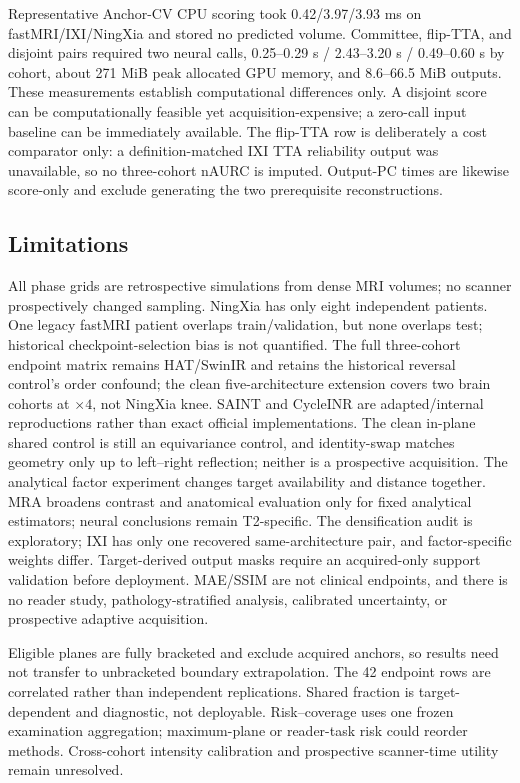 \documentclass[journal,10pt]{IEEEtran}
\begin{document}
Representative Anchor-CV CPU scoring took 0.42/3.97/3.93 ms on fastMRI/IXI/NingXia and stored no predicted volume. Committee, flip-TTA, and disjoint pairs required two neural calls, 0.25--0.29 s / 2.43--3.20 s / 0.49--0.60 s by cohort, about 271 MiB peak allocated GPU memory, and 8.6--66.5 MiB outputs. These measurements establish computational differences only. A disjoint score can be computationally feasible yet acquisition-expensive; a zero-call input baseline can be immediately available.
The flip-TTA row is deliberately a cost comparator only: a definition-matched IXI TTA reliability output was unavailable, so no three-cohort nAURC is imputed. Output-PC times are likewise score-only and exclude generating the two prerequisite reconstructions.



\subsection{Limitations}
All phase grids are retrospective simulations from dense MRI volumes; no scanner prospectively changed sampling. NingXia has only eight independent patients. One legacy fastMRI patient overlaps train/validation, but none overlaps test; historical checkpoint-selection bias is not quantified. The full three-cohort endpoint matrix remains HAT/SwinIR and retains the historical reversal control's order confound; the clean five-architecture extension covers two brain cohorts at $\times4$, not NingXia knee. SAINT and CycleINR are adapted/internal reproductions rather than exact official implementations. The clean in-plane shared control is still an equivariance control, and identity-swap matches geometry only up to left--right reflection; neither is a prospective acquisition. The analytical factor experiment changes target availability and distance together. MRA broadens contrast and anatomical evaluation only for fixed analytical estimators; neural conclusions remain T2-specific. The densification audit is exploratory; IXI has only one recovered same-architecture pair, and factor-specific weights differ. Target-derived output masks require an acquired-only support validation before deployment. MAE/SSIM are not clinical endpoints, and there is no reader study, pathology-stratified analysis, calibrated uncertainty, or prospective adaptive acquisition.

Eligible planes are fully bracketed and exclude acquired anchors, so results need not transfer to unbracketed boundary extrapolation. The 42 endpoint rows are correlated rather than independent replications. Shared fraction is target-dependent and diagnostic, not deployable. Risk--coverage uses one frozen examination aggregation; maximum-plane or reader-task risk could reorder methods. Cross-cohort intensity calibration and prospective scanner-time utility remain unresolved.
\end{document}
